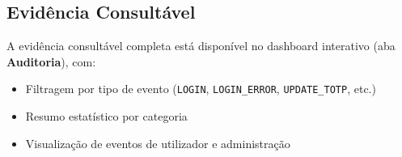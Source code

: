\subsection{Evidência Consultável}

A evidência consultável completa está disponível no dashboard interativo (aba \textbf{Auditoria}), com:
\begin{itemize}
  \item Filtragem por tipo de evento (\texttt{LOGIN}, \texttt{LOGIN\_ERROR}, \texttt{UPDATE\_TOTP}, etc.)
  \item Resumo estatístico por categoria
  \item Visualização de eventos de utilizador e administração
\end{itemize}
